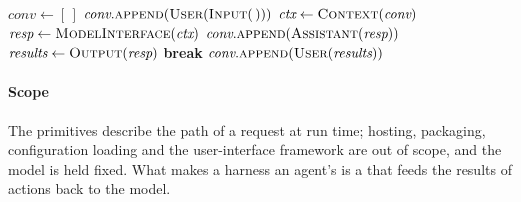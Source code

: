 \begin{algorithm}[t]
\caption{A harness. Lines are labelled with the primitive they implement.}
\label{alg:harness}
\footnotesize
\begin{algorithmic}[1]
  \State $\textit{conv} \gets [\,]$
  \Loop {}
    \State $\textit{conv}.\textsc{append}(\textsc{User}(\Call{Input}{\,}))$ 
    \Loop {}
      \State $\textit{ctx} \gets \Call{Context}{\textit{conv}}$ 
      \State $\textit{resp} \gets \Call{ModelInterface}{\textit{ctx}}$ 
      \State $\textit{conv}.\textsc{append}(\textsc{Assistant}(\textit{resp}))$
      \State $\textit{results} \gets \Call{Output}{\textit{resp}}$ 
       \textbf{break} 
      \EndIf
      \State $\textit{conv}.\textsc{append}(\textsc{User}(\textit{results}))$ 
    \EndLoop
  \EndLoop
\EndProcedure
\end{algorithmic}
\end{algorithm}

\paragraph{Scope} The primitives describe the path of a request at run time; hosting, packaging, configuration loading and the user-interface framework are out of scope, and the model is held fixed. What makes a harness an agent's is a  that feeds the results of actions back to the model.
